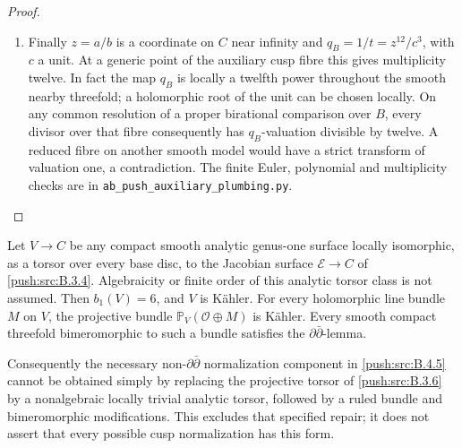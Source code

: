 \begin{proof}
\begin{enumerate}[label=\arabic*.,leftmargin=*]
\item Finally $z=a/b$ is a coordinate on
$C$ near infinity and
$q_B=1/t=z^{12}/c^3$, with $c$ a unit.
At a generic point of the auxiliary
cusp fibre this gives multiplicity
twelve. In fact the map $q_B$ is
locally a twelfth power throughout
the smooth nearby threefold; a
holomorphic root of the unit can
be chosen locally. On any common
resolution of a proper birational
comparison over $B$, every divisor
over that fibre consequently has
$q_B$-valuation divisible by twelve.
A reduced fibre on another smooth
model would have a strict transform
of valuation one, a contradiction.
The finite Euler, polynomial and
multiplicity checks are in
\texttt{ab\_push\_auxiliary\_plumbing.py}.
\end{enumerate}
\end{proof}

\begin{proposition}\label{push:src:B.3.8}\label{push:B38}

Let $V\to C$ be any compact smooth analytic genus-one surface
locally isomorphic, as a torsor over every base disc, to the
Jacobian surface $\mathscr E\to C$ of \ref{push:src:B.3.4}. Algebraicity
or finite order of this analytic torsor class is not assumed.
Then $b_1(V)=6$, and $V$ is K\"ahler. For every holomorphic
line bundle $M$ on $V$, the projective bundle
$\mathbb P_V(\mathcal O\oplus M)$ is K\"ahler. Every smooth
compact threefold bimeromorphic to such a bundle satisfies
the $\partial\bar\partial$-lemma.

Consequently the necessary non-$\partial\bar\partial$
normalization component in \ref{push:src:B.4.5} cannot be obtained simply
by replacing the projective torsor of \ref{push:src:B.3.6} by a nonalgebraic
locally trivial analytic torsor, followed by a ruled bundle
and bimeromorphic modifications. This excludes that specified
repair; it does not assert that every possible cusp
normalization has this form.
\end{proposition}


